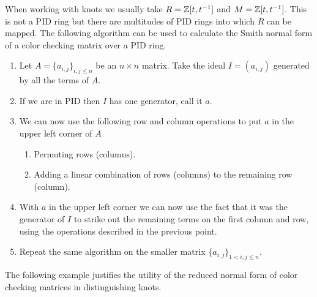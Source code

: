   When working with knots we usually take $R=\operatorname{\mathbb{Z}}[t, t^{-1}]$ and $M=\operatorname{\mathbb{Z}}[t, t^{-1}]$. This is not a PID ring but there are multitudes of PID rings into which $R$ can be mapped. The following algorithm can be used to calculate the Smith normal form of a color checking matrix over a PID ring.

  \begin{enumerate}
    \item Let $A=\{a_{i,j}\}_{i,j\leq n}$ be an $n\times n$ matrix. Take the ideal $I=(a_{i,j})$ generated by all the terms of $A$. 
    \item If we are in PID then $I$ has one generator, call it $a$.
    \item We can now use the following row and column operations to put $a$ in the upper left corner of $A$
      \begin{enumerate}
        \item Permuting rows (columns).
        \item Adding a linear combination of rows (columns) to the remaining row (column).
      \end{enumerate}
    \item With $a$ in the upper left corner we can now use the fact that it was the generator of $I$ to strike out the remaining terms on the first column and row, using the operations described in the previous point.
    \item Repeat the same algorithm on the smaller matrix  $\{a_{i,j}\}_{1<i, j\leq n}$.
  \end{enumerate}

The following example justifies the utility of the reduced normal form of color checking matrices in distinguishing knots.

